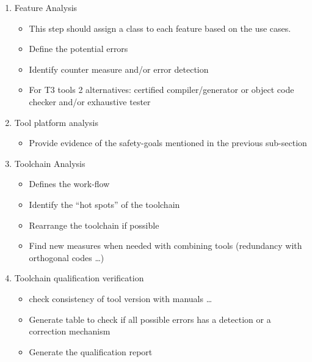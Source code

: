 \documentclass{openetcs_report}
\begin{document}
\begin{enumerate}
\item Feature Analysis
  \begin{itemize}
  \item This step should assign a class to each feature based on the use cases.
  \item Define the potential errors
  \item Identify counter measure and/or error detection
  \item For T3 tools 2 alternatives:  certified compiler/generator or
    object code checker and/or exhaustive tester
  \end{itemize}
\item Tool platform  analysis 
  \begin{itemize}
  \item Provide evidence of the safety-goals mentioned in the
    previous sub-section
  \end{itemize}
\item Toolchain Analysis
  \begin{itemize}
  \item Defines the work-flow
  \item Identify the ``hot spots'' of the toolchain
  \item Rearrange the toolchain if possible
  \item Find new measures when needed with combining tools (redundancy with orthogonal
    codes \ldots{})
  \end{itemize}
\item Toolchain qualification verification 
  \begin{itemize}
  \item check consistency of tool version with  manuals \ldots{}
  \item Generate table to  check if all possible errors has a
    detection or a correction mechanism
\item Generate the qualification report
  \end{itemize}

\end{enumerate}



\end{document}
